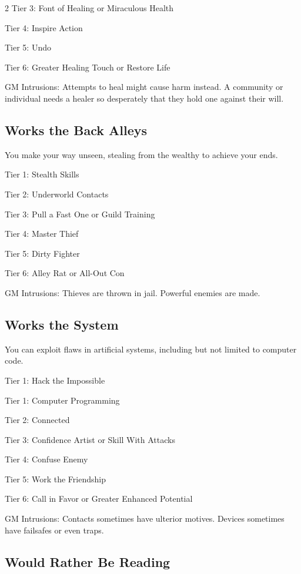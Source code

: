 \begin{multicols}{2}
Tier 3: Font of Healing or Miraculous Health

Tier 4: Inspire Action

Tier 5: Undo

Tier 6: Greater Healing Touch or Restore Life

GM Intrusions: Attempts to heal might cause harm instead. A community or individual needs a healer so desperately that they hold one against their will.

\subsection{Works the Back Alleys}

You make your way unseen, stealing from the wealthy to achieve your ends.

Tier 1: Stealth Skills

Tier 2: Underworld Contacts

Tier 3: Pull a Fast One or Guild Training

Tier 4: Master Thief

Tier 5: Dirty Fighter

Tier 6: Alley Rat or All-Out Con

GM Intrusions: Thieves are thrown in jail. Powerful enemies are made.

\subsection{Works the System}

You can exploit flaws in artificial systems, including but not limited to computer code.

Tier 1: Hack the Impossible

Tier 1: Computer Programming

Tier 2: Connected

Tier 3: Confidence Artist or Skill With Attacks

Tier 4: Confuse Enemy

Tier 5: Work the Friendship

Tier 6: Call in Favor or Greater Enhanced Potential

GM Intrusions: Contacts sometimes have ulterior motives. Devices sometimes have failsafes or even traps.

\subsection{Would Rather Be Reading}


\end{multicols}
